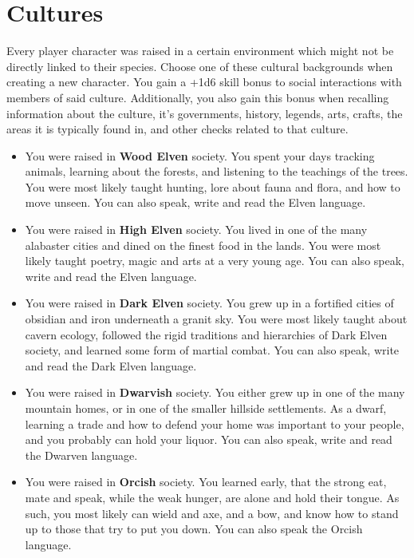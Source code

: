 \chapter{Cultures}\label{ch:cultures}
Every player character was raised in a certain environment which might not be directly linked to their species.
Choose one of these cultural backgrounds when creating a new character.
You gain a +1d6 skill bonus to social interactions with members of said culture.
Additionally, you also gain this bonus when recalling information about the culture, it's governments, history, legends, arts, crafts, the areas it is typically found in, and other checks related to that culture.

\begin{itemize}
    \item You were raised in \textbf{Wood Elven} society.
    You spent your days tracking animals, learning about the forests, and listening to the teachings of the trees.
    You were most likely taught hunting, lore about fauna and flora, and how to move unseen.
    You can also speak, write and read the Elven language.
    \item You were raised in \textbf{High Elven} society.
    You lived in one of the many alabaster cities and dined on the finest food in the lands.
    You were most likely taught poetry, magic and arts at a very young age.
    You can also speak, write and read the Elven language.
    \item You were raised in \textbf{Dark Elven} society.
    You grew up in a fortified cities of obsidian and iron underneath a granit sky.
    You were most likely taught about cavern ecology, followed the rigid traditions and hierarchies of Dark Elven society, and learned some form of martial combat.
    You can also speak, write and read the Dark Elven language.
    \item You were raised in \textbf{Dwarvish} society.
    You either grew up in one of the many mountain homes, or in one of the smaller hillside settlements.
    As a dwarf, learning a trade and how to defend your home was important to your people, and you probably can hold your liquor.
    You can also speak, write and read the Dwarven language.
    \item You were raised in \textbf{Orcish} society.
    You learned early, that the strong eat, mate and speak, while the weak hunger, are alone and hold their tongue.
    As such, you most likely can wield and axe, and a bow, and know how to stand up to those that try to put you down.
    You can also speak the Orcish language.

\end{itemize}
